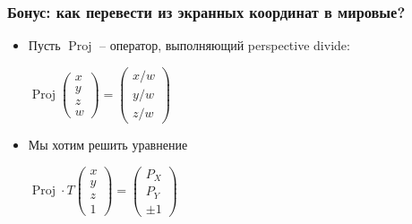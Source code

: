 \documentclass[10pt]{beamer}
\begin{document}
\begin{frame}[fragile]
\frametitle{Бонус: как перевести из экранных координат в мировые?}
\begin{itemize}
\item Пусть \begin{math}\operatorname{Proj}\end{math} -- оператор, выполняющий perspective divide:
\begin{center}
\begin{math}
\operatorname{Proj}\begin{pmatrix}x \\ y \\ z \\ w\end{pmatrix} = \begin{pmatrix}x/w \\ y/w \\ z/w\end{pmatrix}
\end{math}
\end{center}
\pause
\item Мы хотим решить уравнение
\begin{center}
\begin{math}
\operatorname{Proj}\cdot T \begin{pmatrix}x \\ y \\ z \\ 1\end{pmatrix} = \begin{pmatrix}P_X \\ P_Y \\ \pm 1\end{pmatrix}
\end{math}
\end{center}
\end{itemize}
\end{frame}
\end{document}
